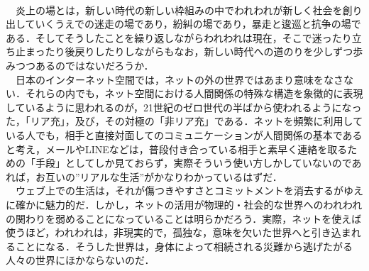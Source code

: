 \documentclass[uplatex,twocolumn,dvipdfmx]{jsarticle}
\begin{document}
\\　炎上の場とは，新しい時代の新しい枠組みの中でわれわれが新しく社会を創り出していくうえでの迷走の場であり，紛糾の場であり，暴走と逡巡と抗争の場である．そしてそうしたことを繰り返しながらわれわれは現在，そこで迷ったり立ち止まったり後戻りしたりしながらもなお，新しい時代への道のりを少しずつ歩みつつあるのではないだろうか．
\\　日本のインターネット空間では，ネットの外の世界ではあまり意味をなさない．それらの内でも，ネット空間における人間関係の特殊な構造を象徴的に表現しているように思われるのが，21世紀のゼロ世代の半ばから使われるようになった，「リア充」，及び，その対極の「非リア充」である．ネットを頻繁に利用している人でも，相手と直接対面してのコミュニケーションが人間関係の基本であると考え，メールやLINEなどは，普段付き合っている相手と素早く連絡を取るための「手段」としてしか見ておらず，実際そういう使い方しかしていないのであれば，お互いの”リアルな生活”がかなりわかっているはずだ．
\\　ウェブ上での生活は，それが傷つきやすさとコミットメントを消去するがゆえに確かに魅力的だ．しかし，ネットの活用が物理的・社会的な世界へのわれわれの関わりを弱めることになっていることは明らかだろう．実際，ネットを使えば使うほど，われわれは，非現実的で，孤独な，意味を欠いた世界へと引き込まれることになる．そうした世界は，身体によって相続される災難から逃げたがる人々の世界にほかならないのだ．
\end{document}
